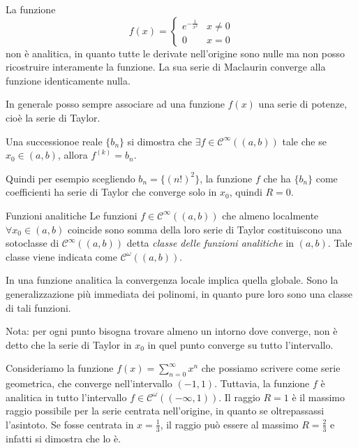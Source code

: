 \documentclass[a4paper]{article}
\begin{document}
\begin{snippetexample}{}
    La funzione
    \[
        f(x) = \begin{cases}
            e^{-\frac{1}{x^2}} & x \neq 0 \\
            0 & x = 0
        \end{cases}
    \]
    non è analitica, in quanto tutte le derivate nell'origine sono nulle
    ma non posso ricostruire interamente la funzione.
    La sua serie di Maclaurin converge alla funzione identicamente nulla.
\end{snippetexample}

In generale posso sempre associare ad una funzione \(f(x)\) una serie di potenze,
cioè la serie di Taylor.

\begin{snippetproposition}{}
    Una successionoe reale \(\{b_n\}\)
    si dimostra che \(\exists f \in \mathcal C^\infty((a,b))\)
    tale che se \(x_0 \in (a,b)\), allora \(f^{(k)} = b_n\).
\end{snippetproposition}

Quindi per esempio scegliendo \(b_n = \{(n!)^2\}\), la funzione \(f\)
che ha \(\{b_n\}\) come coefficienti ha serie di Taylor che converge solo in \(x_0\),
quindi \(R=0\).

\begin{snippetdefinition}{Funzioni analitiche}
    Le funzioni \(f\in\mathcal C^\infty((a,b))\)
    che almeno localmente \(\forall x_0 \in (a,b)\)
    coincide sono somma della loro serie di Taylor costituiscono una sotoclasse di
    \(\mathcal C^\infty((a,b))\) detta \emph{classe delle funzioni analitiche}
    in \((a,b)\). Tale classe viene indicata come \(\mathcal C^\omega((a,b))\).
\end{snippetdefinition}

In una funzione analitica la convergenza locale implica quella globale.
Sono la generalizzazione più immediata dei polinomi, in quanto
pure loro sono una classe di tali funzioni.

Nota: per ogni punto bisogna trovare almeno un intorno dove converge, non è detto
che la serie di Taylor in \(x_0\) in quel punto converge su tutto l'intervallo.

\begin{snippetexample}{}
    Consideriamo la funzione \(f(x) = \sum_{n=0}^\infty x^n\)
    che possiamo scrivere come serie geometrica, che converge nell'intervallo \((-1, 1)\).
    Tuttavia, la funzione \(f\) è analitica in tutto l'intervallo
    \(f\in \mathcal C^\omega((-\infty, 1))\).
    Il raggio \(R=1\) è il massimo raggio possibile per la serie centrata nell'origine,
    in quanto se oltrepassassi l'asintoto.
    Se fosse centrata in \(x=\frac13\), il raggio può essere al massimo \(R=\frac23\)
    e infatti si dimostra che lo è.
\end{snippetexample}
\end{document}
